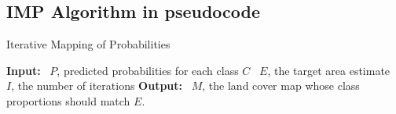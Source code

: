 \subsection*{IMP Algorithm in pseudocode}
    \label{alg:imp}
    \newcommand{\lbox}[2]{\parbox[t]{\dimexpr 0.9\linewidth-#1em}{#2 \strut}}

    \begin{algorithm}[H]
    \caption{Iterative Mapping of Probabilities}
    
    \begin{algorithmic}[1]
    \Statex \textbf{Input:} 
    \Statex \textbullet~$P$, predicted probabilities for each class $C$
    \Statex \textbullet~$E$, the target area estimate 
    \Statex \textbullet~$I$, the number of iterations
    \Statex \textbf{Output:}
    \Statex \textbullet~$M$, the land cover map whose class proportions should match $E$.
    

\end{algorithmic}
\end{algorithm}

